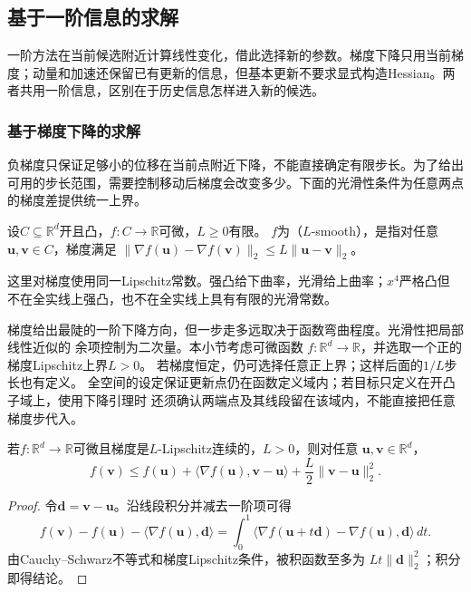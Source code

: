 \subsection{基于一阶信息的求解}
\label{sec:opt-first-order-methods}

一阶方法在当前候选附近计算线性变化，借此选择新的参数。梯度下降只用当前梯度；动量和加速还保留已有更新的信息，但基本更新不要求显式构造Hessian。两者共用一阶信息，区别在于历史信息怎样进入新的候选。

\subsubsection{基于梯度下降的求解}
\label{sec:opt-gradient-descent}

负梯度只保证足够小的位移在当前点附近下降，不能直接确定有限步长。为了给出可用的步长范围，需要控制移动后梯度会改变多少。下面的光滑性条件为任意两点的梯度差提供统一上界。
\begin{definition}[欧氏梯度光滑性]
\label{def:opt-smoothness}
设$C\subseteq\mathbb R^d$开且凸，$f:C\to\mathbb R$可微，$L\geq0$有限。
$f$为（$L$-smooth），是指对任意$\bm u,\bm v\in C$，梯度满足
$\lVert\nabla f(\bm{u})-\nabla f(\bm{v})\rVert_2
\leq L\lVert\bm{u}-\bm{v}\rVert_2$。
\end{definition}
这里对梯度使用同一Lipschitz常数。强凸给下曲率，光滑给上曲率；$x^4$严格凸但
不在全实线上强凸，也不在全实线上具有有限的光滑常数。

梯度给出最陡的一阶下降方向，但一步走多远取决于函数弯曲程度。光滑性把局部线性近似的
余项控制为二次量。本小节考虑可微函数
$f:\mathbb R^d\to\mathbb R$，并选取一个正的梯度Lipschitz上界$L>0$。
若梯度恒定，仍可选择任意正上界；这样后面的$1/L$步长也有定义。
全空间的设定保证更新点仍在函数定义域内；若目标只定义在开凸子域上，使用下降引理时
还须确认两端点及其线段留在该域内，不能直接把任意梯度步代入。

\begin{lemma}[下降引理]
\label{lem:opt-descent}
若$f:\mathbb R^d\to\mathbb R$可微且梯度是$L$-Lipschitz连续的，$L>0$，则对任意
$\bm u,\bm v\in\mathbb R^d$，
\begin{equation}
  f(\bm{v})\leq f(\bm{u})
  +\langle\nabla f(\bm{u}),\bm{v}-\bm{u}\rangle
  +\frac{L}{2}\lVert\bm{v}-\bm{u}\rVert_2^2.
  \label{eq:opt-descent-lemma}
\end{equation}
\end{lemma}

\begin{proof}
令$\bm{d}=\bm{v}-\bm{u}$。沿线段积分并减去一阶项可得
\[
  f(\bm{v})-f(\bm{u})-\langle\nabla f(\bm{u}),\bm{d}\rangle
  =
  \int_0^1
  \langle\nabla f(\bm{u}+t\bm{d})-\nabla f(\bm{u}),\bm{d}\rangle\,dt.
\]
由Cauchy--Schwarz不等式和梯度Lipschitz条件，被积函数至多为
$Lt\lVert\bm{d}\rVert_2^2$；积分即得结论。
\end{proof}

